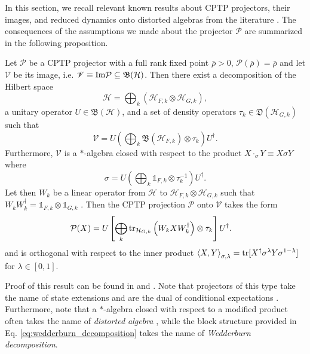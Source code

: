 \documentclass[twocolumn]{autart}    %
\newcommand{\Hc}{\mathcal{H}}
\newcommand{\Pc}{\mathcal{P}}
\newcommand{\Vs}{\mathscr{V}}
\newcommand{\Bf}{\mathfrak{B}}
\newcommand{\Df}{\mathfrak{D}}
\newcommand{\one}{\mathbb{1}}
\newcommand{\tr}{{\rm tr}}
\newcommand{\inner}[2]{\left< #1,#2 \right>}
\begin{document}
In this section, we recall relevant known results about CPTP projectors, their images, and reduced dynamics onto distorted algebras from the literature \cite{lindblad1999general,wolf2012quantum,ticozzi2017alternating,bialonczyk2018application,blume2010information,grigoletto2024exact,wolf2010inverseeigenvalueproblemquantum}. The consequences of the assumptions we made about the projector $\Pc$ are summarized in the following proposition. 
\begin{prop}
\label{prop:structure_of_fixed_points}
    Let $\Pc$ be a CPTP projector with a full rank fixed point $\bar{\rho}>0$, $\Pc(\bar{\rho})=\bar{\rho}$ and let $\Vs$ be its image, i.e. $ \Vs \equiv {\rm Im}\Pc \subseteq\Bf(\Hc)$. 
    Then there exist a decomposition of the Hilbert space \[\Hc = \bigoplus_k (\Hc_{F,k}\otimes\Hc_{G,k}),\] a unitary operator $U\in\Bf(\Hc)$, and a set of density operators $\tau_k\in\Df(\Hc_{G,k})$ such that 
    \begin{equation}
        \Vs = U\left(\bigoplus_k \Bf(\Hc_{F,k}) \otimes \tau_k  \right) U^\dag.
        \label{eq:wedderburn_decomposition}
    \end{equation}
    Furthermore, $\Vs$ is a $*$-algebra closed with respect to the product $X\cdot_\sigma Y \equiv X \sigma Y$ where \[\sigma = U\left(\bigoplus_k\one_{F,k}\otimes \tau_k^{-1}\right)U^\dag.\]  
    Let then $W_k$ be a linear operator from $\Hc$ to $\Hc_{F,k}\otimes\Hc_{G,k}$ such that $W_k W_k^\dag=\one_{F,k}\otimes \one_{G,k}$ \cite{wolf2012quantum}. Then the CPTP projection $\Pc$ onto $\Vs$ takes the form
    \begin{align}
         \Pc(X) 
            &= U\left[ \bigoplus_{k} \tr_{\Hc_{G,k}}\left(W_k X W_k^\dag \right)\otimes \tau_k  \right] U^\dag.
        \label{eqn:state_ext_blocks}
    \end{align}
    and is orthogonal with respect to the inner product $\inner{X}{Y}_{\sigma,\lambda} = \tr[X^\dag \sigma^\lambda Y \sigma^{1-\lambda}]$ for $\lambda\in[0,1]$.
\end{prop}
Proof of this result can be found in \cite{lindblad1999general} and \cite{wolf2010inverseeigenvalueproblemquantum,wolf2012quantum,tit2023,ticozzi2017alternating,johnson2015general}. Note that projectors of this type take the name of state extensions and are the dual of conditional expectations \cite{petz2007quantum,blackadar2006operator}. Furthermore, note that a $*$-algebra closed with respect to a modified product often takes the name of \textit{distorted algebra} \cite{blume2010information}, while the block structure provided in Eq. \eqref{eq:wedderburn_decomposition} takes the name of \textit{Wedderburn decomposition}. 
\end{document}
